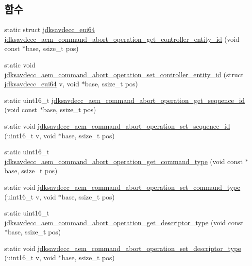 \subsection*{함수}
\begin{DoxyCompactItemize}
\item 
static struct \hyperlink{structjdksavdecc__eui64}{jdksavdecc\+\_\+eui64} \hyperlink{group__command__abort__operation_ga212c8b390e1a1306f97b21e7fc58fa2e}{jdksavdecc\+\_\+aem\+\_\+command\+\_\+abort\+\_\+operation\+\_\+get\+\_\+controller\+\_\+entity\+\_\+id} (void const $\ast$base, ssize\+\_\+t pos)
\item 
static void \hyperlink{group__command__abort__operation_ga5dcebbc5fe125b5bb2b376086f86426e}{jdksavdecc\+\_\+aem\+\_\+command\+\_\+abort\+\_\+operation\+\_\+set\+\_\+controller\+\_\+entity\+\_\+id} (struct \hyperlink{structjdksavdecc__eui64}{jdksavdecc\+\_\+eui64} v, void $\ast$base, ssize\+\_\+t pos)
\item 
static uint16\+\_\+t \hyperlink{group__command__abort__operation_gacb0e640790e11a4ae18eda7a81873ede}{jdksavdecc\+\_\+aem\+\_\+command\+\_\+abort\+\_\+operation\+\_\+get\+\_\+sequence\+\_\+id} (void const $\ast$base, ssize\+\_\+t pos)
\item 
static void \hyperlink{group__command__abort__operation_gac068108fa33818cbb1d6cfee475f4fc6}{jdksavdecc\+\_\+aem\+\_\+command\+\_\+abort\+\_\+operation\+\_\+set\+\_\+sequence\+\_\+id} (uint16\+\_\+t v, void $\ast$base, ssize\+\_\+t pos)
\item 
static uint16\+\_\+t \hyperlink{group__command__abort__operation_gaacebbc43790e63ae0bf6e5727e66e7a8}{jdksavdecc\+\_\+aem\+\_\+command\+\_\+abort\+\_\+operation\+\_\+get\+\_\+command\+\_\+type} (void const $\ast$base, ssize\+\_\+t pos)
\item 
static void \hyperlink{group__command__abort__operation_ga35aa4383af4871a7168f9f8ee75964a0}{jdksavdecc\+\_\+aem\+\_\+command\+\_\+abort\+\_\+operation\+\_\+set\+\_\+command\+\_\+type} (uint16\+\_\+t v, void $\ast$base, ssize\+\_\+t pos)
\item 
static uint16\+\_\+t \hyperlink{group__command__abort__operation_ga1cf7f2602b7bc70c78ce76683416e4c8}{jdksavdecc\+\_\+aem\+\_\+command\+\_\+abort\+\_\+operation\+\_\+get\+\_\+descriptor\+\_\+type} (void const $\ast$base, ssize\+\_\+t pos)
\item 
static void \hyperlink{group__command__abort__operation_ga25de2bd6c128f678dafb1f338a7a7b2e}{jdksavdecc\+\_\+aem\+\_\+command\+\_\+abort\+\_\+operation\+\_\+set\+\_\+descriptor\+\_\+type} (uint16\+\_\+t v, void $\ast$base, ssize\+\_\+t pos)

\end{DoxyCompactItemize}
